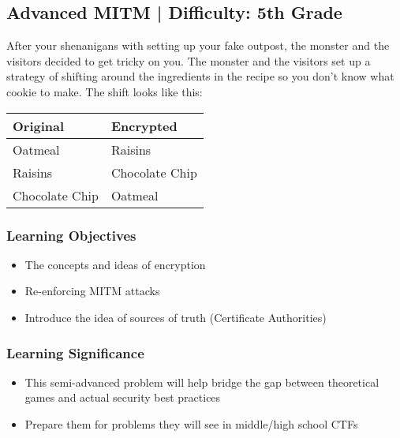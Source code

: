 \documentclass{article}
\begin{document}
\pagebreak

\subsection{Advanced MITM | Difficulty: 5th Grade}

After your shenanigans with setting up your fake outpost, the monster
and the visitors decided to get tricky on you. The monster and the
visitors set up a strategy of shifting around the ingredients in the
recipe so you don't know what cookie to make. The shift looks like
this: %
\begin{table}[h]
\centering
\begin{tabular}{l|l}
\textbf{Original}       & \textbf{Encrypted}      \\ \hline
Oatmeal        & Raisins        \\ \hline
Raisins        & Chocolate Chip \\ \hline
Chocolate Chip & Oatmeal        \\
\end{tabular}
\end{table}

\subsubsection{Learning Objectives}

\begin{itemize}
  \item The concepts and ideas of encryption
  \item Re-enforcing MITM attacks
  \item Introduce the idea of sources of truth (Certificate
    Authorities)
\end{itemize}

\subsubsection{Learning Significance}

\begin{itemize}
  \item This semi-advanced problem will help bridge the gap between
    theoretical games and actual security best practices
  \item Prepare them for problems they will see in middle/high school CTFs
\end{itemize}
\end{document}
